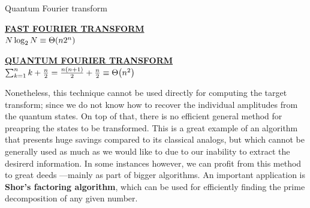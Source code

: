 \documentclass[9pt, handout, aspectratio=169]{beamer}	%
\begin{document}
\begin{frame}[allowframebreaks]{Quantum Fourier transform}
	\begin{multicols}{2}
	\begin{centering}

		\underline{\textbf{FAST FOURIER TRANSFORM}}\\
		\medskip
		$N\log_2 N \equiv \Theta\qty(n2^n)$

		\columnbreak

		\underline{\textbf{QUANTUM FOURIER TRANSFORM}}\\
		\medskip
		$\sum_{k=1}^{n}k + \frac{n}{2} =
			\frac{n\qty(n+1)}{2} + \frac{n}{2} \equiv \Theta\qty(n^2)$

	\end{centering}
	\end{multicols}

	Nonetheless, this technique cannot be used directly for computing the target transform; since we do not know how to recover the individual amplitudes from the quantum states. On top of that, there is no efficient general method for preapring the states to be transformed. This is a great example of an algorithm that presents huge savings compared to its classical analogs, but which cannot be generally used as much as we would like to due to our inability to extract the desirerd information. In some instances however, we can profit from this method to great deeds ---mainly as part of bigger algorithms. An important application is \textbf{Shor's factoring algorithm}, which can be used for efficiently finding the prime decomposition of any given number.

\end{frame}

\end{document}
